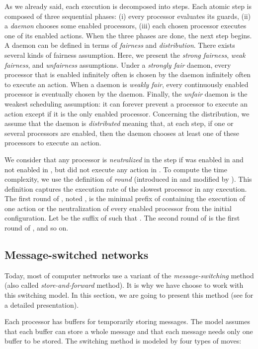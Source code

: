 \documentclass[11pt]{article}
\begin{document}
As we already said, each execution is decomposed into steps. Each atomic step is composed of three sequential phases: (i) every processor evaluates its guards, (ii) a \emph{daemon} chooses some enabled processors, (iii) each chosen processor executes one of its enabled actions. When the three phases are done, the next step begins. A daemon can be defined in terms of \emph{fairness} and \emph{distribution}. There exists several kinds of fairness assumption. Here, we present the \emph{strong fairness}, \emph{weak fairness}, and \emph{unfairness} assumptions. Under a \emph{strongly fair} daemon, every processor that is enabled infinitely often is chosen by the daemon infinitely often to execute an action. When a daemon is \emph{weakly fair}, every continuously enabled processor is eventually chosen by the daemon. Finally, the \emph{unfair} daemon is the weakest scheduling assumption: it can forever prevent a processor to execute an action except if it is the only enabled processor. Concerning the distribution, we assume that the daemon is \emph{distributed} meaning that, at each step, if one or several processors are enabled, then the daemon chooses at least one of these processors to execute an action. 

We consider that any processor  is \emph{neutralized} in the step  if  was enabled in  and not enabled in , but did not execute any action in . To compute the time complexity, we use the definition of \emph{round} (introduced in \cite{DIM97} and modified by \cite{BDPV07}). This definition captures the execution rate of the slowest processor in any execution. The first round of , noted , is the minimal prefix of  containing the execution of one action or the neutralization of every enabled processor from the initial configuration. Let  be the suffix of  such that . The second round of  is the first round of , and so on.

\subsection{Message-switched networks}\label{sub:Message-switched-network}

Today, most of computer networks use a variant of the \emph{message-switching} method (also called \emph{store-and-forward} method). It is why we have choose to work with this switching model. In this section, we are going to present this method (see \cite{T01} for a detailed presentation).

Each processor has  buffers for temporarily storing messages. The model assumes that each buffer can store a whole message and that each message needs only one buffer to be stored. The switching method is modeled by four types of moves:
\end{document}
